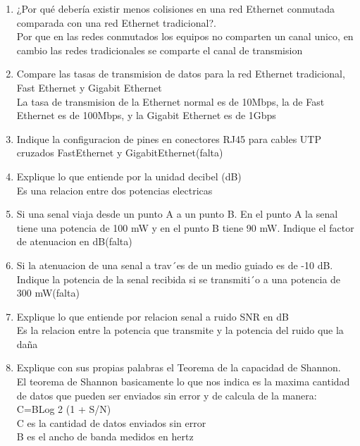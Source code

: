 \documentclass{udparticle}
\begin{document}
\begin{enumerate}
    \item ¿Por qué debería existir menos colisiones en una red Ethernet conmutada comparada con una
    red Ethernet tradicional?.\\
    Por que en las redes conmutados los equipos no comparten un canal unico, en cambio las redes tradicionales se comparte el canal de
    transmision \\
    \item Compare las tasas de transmision de datos para la red Ethernet tradicional, Fast Ethernet y Gigabit Ethernet\\
    La tasa de transmision de la Ethernet normal es de 10Mbps, la de Fast Ethernet es de 100Mbps, y la Gigabit Ethernet es de 1Gbps\\
    \item Indique la conﬁguracion de pines en conectores RJ45 para cables UTP cruzados FastEthernet y GigabitEthernet(falta)\\
    \item  Explique lo que entiende por la unidad decibel (dB)\\
    Es una relacion entre dos potencias electricas\\
    \item Si una senal viaja desde un punto A a un punto B. En el punto A la senal tiene una potencia de 100 mW y en el punto B tiene 90 mW. Indique el factor de atenuacion en dB(falta)\\
    \item Si la atenuacion de una senal a trav´es de un medio guiado es de -10 dB. Indique la potencia de la senal recibida si se transmiti´o a una potencia de 300 mW(falta)\\
    \item Explique lo que entiende por relacion senal a ruido SNR en dB\\
    Es la relacion entre la potencia que transmite y la potencia del ruido que la daña\\
    \item  Explique con sus propias palabras el Teorema de la capacidad de Shannon. \\
    El teorema de Shannon basicamente lo que nos indica es la maxima cantidad de datos que pueden ser enviados sin error y de calcula de la manera:\\
            C=BLog 2 (1 + S/N)\\
            C es la cantidad de datos enviados sin error\\
            B es el ancho de banda medidos en hertz\\

\end{enumerate}
\end{document}
